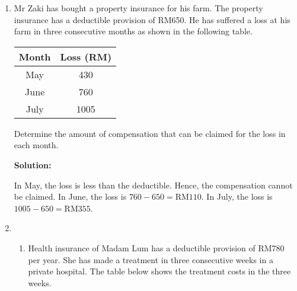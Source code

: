 \documentclass{report}
\newcommand{\sol}{

    \vspace{0.5em}\textbf{Solution:}\vspace{0.5em}}
\begin{document}
\begin{enumerate}
\begin{enumerate}
                    The NCD discount is $889.90 \times 55 \% = \text{RM} 489.445$.

                    The gross premium is $889.90 - 489.445 = \text{RM} 400.46$. \vspace{0.5cm}

              \item Third party, fire and theft \sol{}

                    The gross premium for third party, fire and theft is $75 \%$ of the
                    comprehensive policy's gross premium, which is $75\% \times 400.46 = \text{RM}
                        300.34$.
          \end{enumerate}
          \vspace{0.5cm}

    \item Mr Zaki has bought a property insurance for his farm. The property insurance
          has a deductible provision of RM650. He has suffered a loss at his farm in
          three consecutive months as shown in the following table.

          \begin{tabular}{|c|c|}
              \hline Month & Loss (RM) \\
              \hline May   & 430       \\
              \hline June  & 760       \\
              \hline July  & 1005      \\
              \hline
          \end{tabular}

          Determine the amount of compensation that can be claimed for the loss in each
          month.

          \sol{}

          In May, the loss is less than the deductible. Hence, the compensation cannot be
          claimed. In June, the loss is $760 - 650 = \text{RM} 110$. In July, the loss is
          $1005 - 650 = \text{RM} 355$.

    \item \begin{enumerate}
              \item Health insurance of Madam Lum has a deductible provision of RM780 per year. She
                    has made a treatment in three consecutive weeks in a private hospital. The
                    table below shows the treatment costs in the three weeks.


\end{enumerate}
\end{enumerate}
\end{document}
